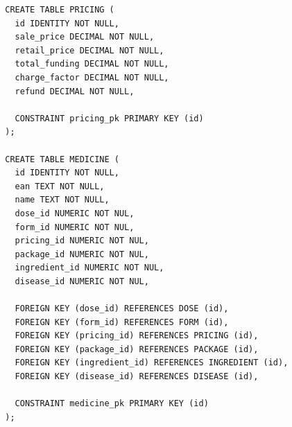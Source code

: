 \documentclass{article}
\begin{document}
    \begin{minipage}{.45\textwidth}
      \begin{lstlisting}
        CREATE TABLE PRICING (
          id IDENTITY NOT NULL,
          sale_price DECIMAL NOT NULL,
          retail_price DECIMAL NOT NULL,
          total_funding DECIMAL NOT NULL,
          charge_factor DECIMAL NOT NULL,
          refund DECIMAL NOT NULL,

          CONSTRAINT pricing_pk PRIMARY KEY (id)
        );

        CREATE TABLE MEDICINE (
          id IDENTITY NOT NULL,
          ean TEXT NOT NULL,
          name TEXT NOT NULL,
          dose_id NUMERIC NOT NUL,
          form_id NUMERIC NOT NUL,
          pricing_id NUMERIC NOT NUL,
          package_id NUMERIC NOT NUL,
          ingredient_id NUMERIC NOT NUL,
          disease_id NUMERIC NOT NUL,

          FOREIGN KEY (dose_id) REFERENCES DOSE (id),
          FOREIGN KEY (form_id) REFERENCES FORM (id),
          FOREIGN KEY (pricing_id) REFERENCES PRICING (id),
          FOREIGN KEY (package_id) REFERENCES PACKAGE (id),
          FOREIGN KEY (ingredient_id) REFERENCES INGREDIENT (id),
          FOREIGN KEY (disease_id) REFERENCES DISEASE (id),

          CONSTRAINT medicine_pk PRIMARY KEY (id)
        );
      \end{lstlisting}
    \end{minipage}
\end{document}
